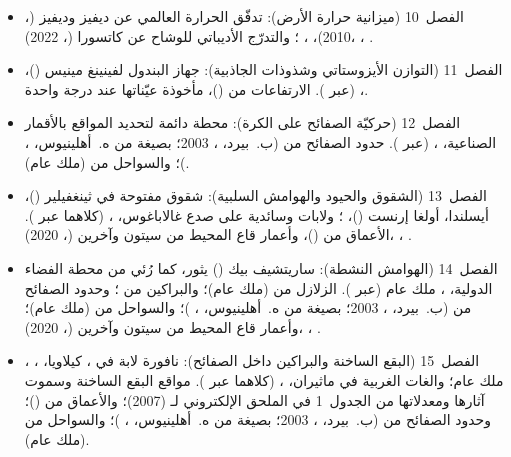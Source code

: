 \begin{itemize}
  \item الفصل~10 (ميزانية حرارة الأرض): تدفّق الحرارة العالمي عن ديفيز وديفيز (، 2010)، ، ؛ والتدرّج الأديباتي للوشاح عن كاتسورا (، 2022)، ، .
  \item الفصل~11 (التوازن الأيزوستاتي وشذوذات الجاذبية): جهاز البندول لفينينغ مينيس ()، ،  (عبر ). الارتفاعات من  ()، مأخوذة عيّناتها عند درجة واحدة.
  \item الفصل~12 (حركيّة الصفائح على الكرة): محطة دائمة لتحديد المواقع بالأقمار الصناعية، ،  (عبر ). حدود الصفائح من  (ب.~بيرد، ، 2003؛ بصيغة  من ه.~أهلينيوس، ، )؛ والسواحل من  (ملك عام).
  \item الفصل~13 (الشقوق والحيود والهوامش السلبية): شقوق مفتوحة في ثينغفيلير ()، أيسلندا، أولغا إرنست ()، ؛ ولابات وسائدية على صدع غالاباغوس، ،  (كلاهما عبر ). الأعماق من  ()، وأعمار قاع المحيط من سيتون وآخرين (، 2020)، ، .
  \item الفصل~14 (الهوامش النشطة): ساريتشيف بيك () يثور، كما رُئي من محطة الفضاء الدولية، ، ملك عام (عبر ). الزلازل من  (ملك عام)؛ والبراكين من ؛ وحدود الصفائح من  (ب.~بيرد، ، 2003؛ بصيغة  من ه.~أهلينيوس، ، )؛ والسواحل من  (ملك عام)؛ وأعمار قاع المحيط من سيتون وآخرين (، 2020)، ، .
  \item الفصل~15 (البقع الساخنة والبراكين داخل الصفائح): نافورة لابة في ، كيلاويا، ، ، ملك عام؛ والغات الغربية في ماثيران، ،  (كلاهما عبر ). مواقع البقع الساخنة وسموت آثارها ومعدلاتها من الجدول~1 في الملحق الإلكتروني لـ (2007)؛ والأعماق من  ()؛ وحدود الصفائح من  (ب.~بيرد، ، 2003؛ بصيغة  من ه.~أهلينيوس، ، )؛ والسواحل من  (ملك عام).

\end{itemize}
